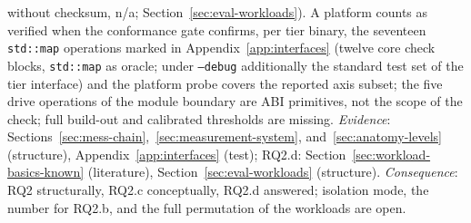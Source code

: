 \begin{nurkurz}
without checksum, n/a; Section~\ref{sec:eval-workloads}). A platform counts as verified when the
conformance gate confirms, per tier binary, the seventeen \texttt{std::map} operations marked in
Appendix~\ref{app:interfaces} (twelve core check blocks, \texttt{std::map} as oracle; under
\texttt{--debug} additionally the standard test set of the tier interface) and the platform
probe covers the reported axis subset; the five drive operations of the module boundary are ABI primitives,
not the scope of the check; full build-out and calibrated thresholds are missing.
\emph{Evidence}:
Sections~\ref{sec:mess-chain},~\ref{sec:measurement-system}, and~\ref{sec:anatomy-levels} (structure),
Appendix~\ref{app:interfaces} (test); RQ2.d: Section~\ref{sec:workload-basics-known} (literature),
Section~\ref{sec:eval-workloads} (structure).
\emph{Consequence}: RQ2 structurally, RQ2.c conceptually,
RQ2.d answered; isolation mode, the number for RQ2.b, and the full permutation of the workloads are open.
\end{nurkurz}

